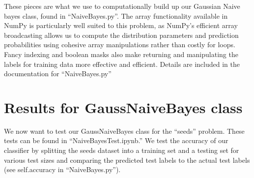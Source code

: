 \documentclass[12pt]{article}
\begin{document}
These pieces are what we use to computationally build up our Gaussian Naive bayes class, found in ``NaiveBayes.py''. 
The array functionality available in NumPy is particularly well suited to this problem, as NumPy's efficient array broadcasting allows us to compute the distribution parameters and prediction probabilities using cohesive array manipulations rather than costly for loops. 
Fancy indexing  and boolean masks also make returning and manipulating the labels for training data more effective and efficient.
Details are included in the documentation for ``NaiveBayes.py''

\section*{Results for GaussNaiveBayes class}
We now want to test our GaussNaiveBayes class for the ``seeds'' problem. 
These tests can be found in ``NaiveBayesTest.ipynb.''
We test the accuracy of our classifier by splitting the seeds dataset into a training set and a testing set for various test sizes and comparing the predicted test labels to the actual test labels (see self.accuracy in ``NaiveBayes.py''). 
\end{document}
